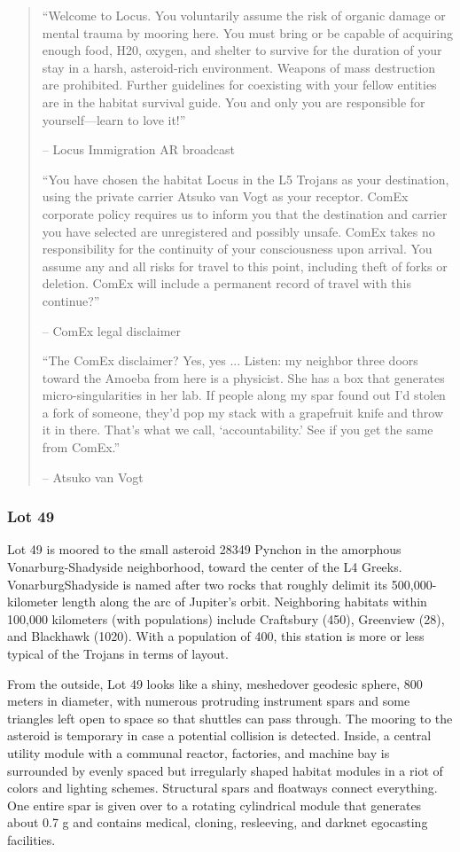 \begin{quotation} “Welcome to Locus. You voluntarily assume the risk of organic damage or mental trauma by mooring here. You must bring or be capable of acquiring enough food, H20, oxygen, and shelter to survive for the duration of your stay in a harsh, asteroid-rich environment. Weapons of mass destruction are prohibited. Further guidelines for coexisting with your fellow entities are in the habitat survival guide. You and only you are responsible for yourself—learn to love it!” 

-- Locus Immigration AR broadcast 

“You have chosen the habitat Locus in the L5 Trojans as your destination, using the private carrier Atsuko van Vogt as your receptor. ComEx corporate policy requires us to inform you that the destination and carrier you have selected are unregistered and possibly unsafe. ComEx takes no responsibility for the continuity of your consciousness upon arrival. You assume any and all risks for travel to this point, including theft of forks or deletion. ComEx will include a permanent record of travel with this continue?” 

-- ComEx legal disclaimer 

“The ComEx disclaimer? Yes, yes ... Listen: my neighbor three doors toward the Amoeba from here is a physicist. She has a box that generates micro-singularities in her lab. If people along my spar found out I’d stolen a fork of someone, they’d pop my stack with a grapefruit knife and throw it in there. That’s what we call, ‘accountability.’ See if you get the same from ComEx.” 

-- Atsuko van Vogt \end{quotation} 

\subsubsection{Lot 49} \label{sec:lot-49} 

Lot 49 is moored to the small asteroid 28349 Pynchon in the amorphous Vonarburg-Shadyside neighborhood, toward the center of the L4 Greeks. VonarburgShadyside is named after two rocks that roughly delimit its 500,000-kilometer length along the arc of Jupiter's orbit. Neighboring habitats within 100,000 kilometers (with populations) include Craftsbury (450), Greenview (28), and Blackhawk (1020). With a population of 400, this station is more or less typical of the Trojans in terms of layout. 

From the outside, Lot 49 looks like a shiny, meshedover geodesic sphere, 800 meters in diameter, with numerous protruding instrument spars and some triangles left open to space so that shuttles can pass through. The mooring to the asteroid is temporary in case a potential collision is detected. Inside, a central utility module with a communal reactor, factories, and machine bay is surrounded by evenly spaced but irregularly shaped habitat modules in a riot of colors and lighting schemes. Structural spars and floatways connect everything. One entire spar is given over to a rotating cylindrical module that generates about 0.7 g and contains medical, cloning, resleeving, and darknet egocasting facilities. 

